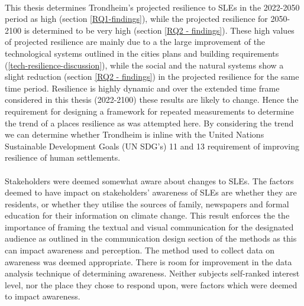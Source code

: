 \paragraph{}
This thesis determines Trondheim's projected resilience to SLEs in the 2022-2050 period as high (section \ref{RQ1-findings}), while the projected resilience for 2050-2100 is determined to be very high (section \ref{RQ2 - findings}). These high values of projected resilience are mainly due to a the large improvement of the technological systems outlined in the cities plans and building requirements (\ref{tech-resilience-discussion}), while the social and the natural systems show a slight reduction (section \ref{RQ2 - findings}) in the projected resilience for the same time period. Resilience is highly dynamic and over the extended time frame considered in this thesis (2022-2100) these results are likely to change. Hence the requirement for designing a framework for repeated measurements to determine the trend of a places resilience as was attempted here. By considering the trend we can determine whether Trondheim is inline with the United Nations Sustainable Development Goals (UN SDG’s) 11 and 13 requirement of improving resilience of human settlements.

\paragraph{}
Stakeholders were deemed somewhat aware about changes to SLEs. The factors deemed to have impact on stakeholders' awareness of SLEs are whether they are residents, or whether they utilise the sources of family, newspapers and formal education for their information on climate change. This result enforces the the importance of framing the textual and visual communication for the designated audience as outlined in the communication design section of the methods as this can impact awareness and perception.  The method used to collect data on awareness was deemed appropriate. There is room for improvement in the data analysis technique of determining awareness. Neither subjects self-ranked interest level, nor the place they chose to respond upon, were factors which were deemed to impact awareness.
\paragraph{}



